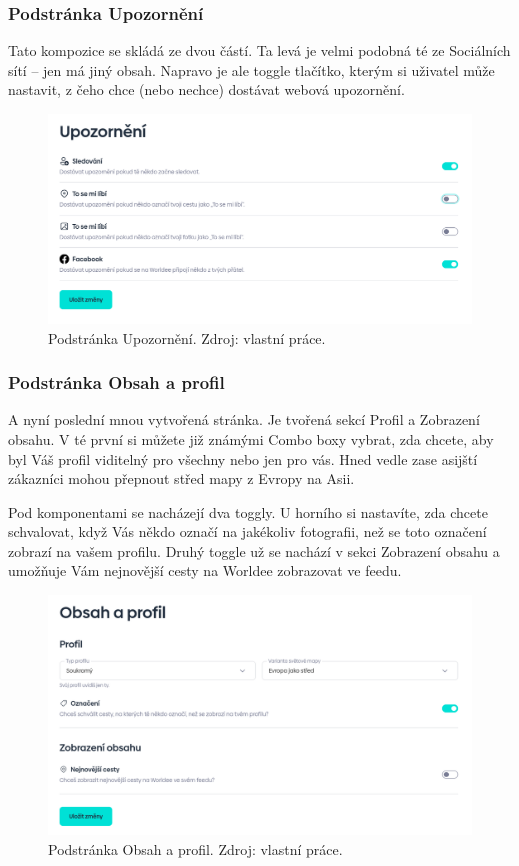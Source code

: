 \newpage
\subsubsection{Podstránka Upozornění}
Tato kompozice se skládá ze dvou částí. Ta levá je velmi podobná té ze Sociálních sítí – jen má jiný obsah. Napravo je ale toggle tlačítko, kterým si uživatel může nastavit, z čeho chce (nebo nechce) dostávat webová upozornění.

\begin{figure}[!h]
    \centering
    \includegraphics[width=1\linewidth]{obrazky/notify_settings.png}
    \caption{Podstránka Upozornění. Zdroj: vlastní práce.}
\end{figure}


\newpage
\subsubsection{Podstránka Obsah a profil}
A nyní poslední mnou vytvořená stránka. Je tvořená sekcí Profil a Zobrazení obsahu. V té první si můžete již známými Combo boxy vybrat, zda chcete, aby byl Váš profil viditelný pro všechny nebo jen pro vás. Hned vedle zase asijští zákazníci mohou přepnout střed mapy z Evropy na Asii.

Pod komponentami se nacházejí dva toggly. U horního si nastavíte, zda chcete schvalovat, když Vás někdo označí na jakékoliv fotografii, než se toto označení zobrazí na vašem profilu. Druhý toggle už se nachází v sekci Zobrazení obsahu a umožňuje Vám nejnovější cesty na Worldee zobrazovat ve feedu.

\begin{figure}[!h]
    \centering
    \includegraphics[width=1\linewidth]{obrazky/content_and_profile.png}
    \caption{Podstránka Obsah a profil. Zdroj: vlastní práce.}
\end{figure}


